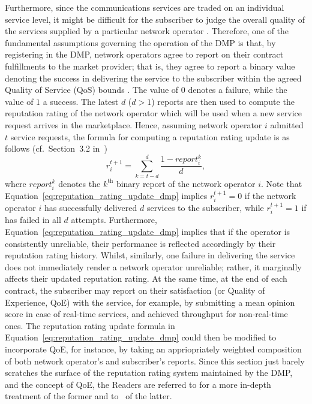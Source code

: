 Furthermore, since the communications services are traded on an individual service level, it might be difficult for the subscriber to judge the overall quality of the services supplied by a particular network operator \cite{DMIrvine02}. Therefore, one of the fundamental assumptions governing the operation of the DMP is that, by registering in the DMP, network operators agree to report on their contract fulfillments to the market provider; that is, they agree to report a binary value denoting the success in delivering the service to the subscriber within the agreed Quality of Service (QoS) bounds \cite{DMLeBodic00}. The value of $0$ denotes a failure, while the value of $1$ a success. The latest $d$ ($d>1$) reports are then used to compute the reputation rating of the network operator which will be used when a new service request arrives in the marketplace. Hence, assuming network operator $i$ admitted $t$ service requests, the formula for computing a reputation rating update is as follows (cf.~Section~3.2 in~\cite{DMLeBodic00})
\begin{equation}
    \label{eq:reputation_rating_update_dmp}
    r_i^{t+1} = \sum_{k = t-d}^d \frac{1 - report_i^k}{d},
\end{equation}
where $report_i^k$ denotes the $k^{\text{th}}$ binary report of the network operator $i$. Note that Equation~\eqref{eq:reputation_rating_update_dmp} implies $r_i^{t+1} = 0$ if the network operator $i$ has successfully delivered $d$ services to the subscriber, while $r_i^{t+1} = 1$ if has failed in all $d$ attempts. Furthermore, Equation~\eqref{eq:reputation_rating_update_dmp} implies that if the operator is consistently unreliable, their performance is reflected accordingly by their reputation rating history. Whilst, similarly, one failure in delivering the service does not immediately render a network operator unreliable; rather, it marginally affects their updated reputation rating. At the same time, at the end of each contract, the subscriber may report on their satisfaction (or Quality of Experience, QoE) with the service, for example, by submitting a mean opinion score in case of real-time services, and achieved throughput for non-real-time ones. The reputation rating update formula in Equation~\eqref{eq:reputation_rating_update_dmp} could then be modified to incorporate QoE, for instance, by taking an appriopriately weighted composition of both network operator's and subscriber's reports. Since this section just barely scratches the surface of the reputation rating system maintained by the DMP, and the concept of QoE, the Readers are referred to \cite{DMLeBodic00, LeBodicThesis, DMIrvine02, DMMathur02, DMIrvine01, DMMcDiarmid06} for a more in-depth treatment of the former and to~\cite{Kilkki2008, BrooksHestnes2010, Fiedler2010, Shaikh2010} of the latter.

